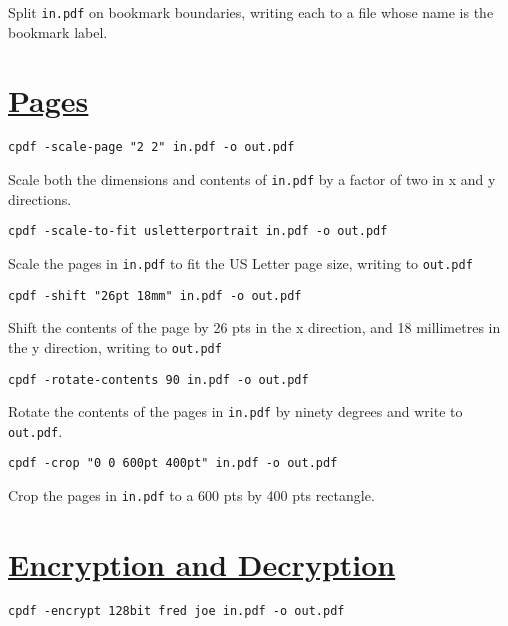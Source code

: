 \documentclass{book}
\begin{document}
\noindent Split \texttt{in.pdf} on bookmark boundaries, writing each to a file whose name is the bookmark label.

\section*{\hyperref[chap:3]{Pages}}

\begin{framed}\noindent\texttt{cpdf -scale-page "2 2" in.pdf -o out.pdf}\end{framed}

\noindent Scale both the dimensions and contents of \texttt{in.pdf} by a factor of two in x and y directions.

\begin{framed}\noindent\texttt{cpdf -scale-to-fit usletterportrait in.pdf -o out.pdf}\end{framed}

\noindent Scale the pages in \texttt{in.pdf} to fit the US Letter page size, writing to \texttt{out.pdf}

\begin{framed}\noindent\texttt{cpdf -shift "26pt 18mm" in.pdf -o out.pdf}\end{framed}

\noindent Shift the contents of the page by 26 pts in the x direction, and 18 millimetres in the y direction, writing to \texttt{out.pdf}

\begin{framed}\noindent\texttt{cpdf -rotate-contents 90 in.pdf -o out.pdf}\end{framed}

\noindent Rotate the contents of the pages in \texttt{in.pdf} by ninety degrees and write to \texttt{out.pdf}.

\begin{framed}\noindent\texttt{cpdf -crop "0 0 600pt 400pt" in.pdf -o out.pdf}\end{framed}

\noindent Crop the pages in \texttt{in.pdf} to a 600 pts by 400 pts rectangle.


\section*{\hyperref[chap:4]{Encryption and Decryption}}

\begin{framed}\noindent\texttt{cpdf -encrypt 128bit fred joe in.pdf -o out.pdf}\end{framed}
\end{document}

